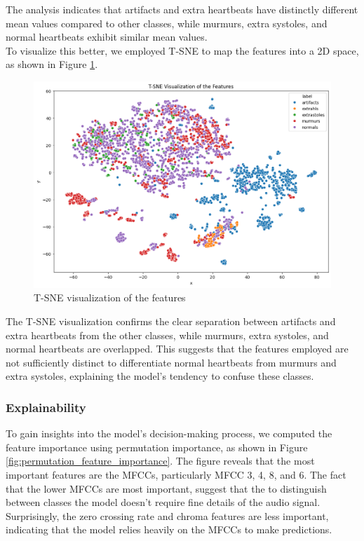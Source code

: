 \noindent
The analysis indicates that artifacts and extra heartbeats have distinctly different mean values compared to other classes, while murmurs, extra systoles,
and normal heartbeats exhibit similar mean values.\\ To visualize this better, we employed T-SNE to map the features into a 2D space, as shown in Figure \ref{fig:t_sne_visualization}.

\begin{figure}[h]
    \centering
    \includegraphics[width=\columnwidth]{../images/t-sne_feature_visualization.png}
    \caption{T-SNE visualization of the features}
    \label{fig:t_sne_visualization}
\end{figure}
\noindent
The T-SNE visualization confirms the clear separation between artifacts and extra heartbeats from the other classes, while murmurs, extra systoles,
and normal heartbeats are overlapped. This suggests that the features employed are not sufficiently distinct to differentiate normal heartbeats
from murmurs and extra systoles, explaining the model's tendency to confuse these classes.


\subsubsection*{Explainability}

To gain insights into the model's decision-making process, we computed the feature importance using permutation importance,
as shown in Figure \ref{fig:permutation_feature_importance}. The figure reveals that the most important features are the MFCCs, particularly MFCC 3, 4, 8, and 6.
The fact that the lower MFCCs are most important, suggest that the to distinguish between classes the model doesn't require fine details of the audio signal.
Surprisingly, the zero crossing rate and chroma features are less important, indicating that the model relies heavily on the MFCCs to make predictions.

